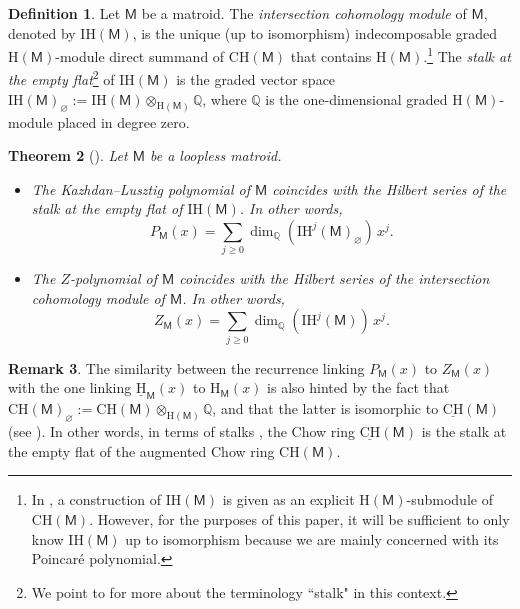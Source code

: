 \documentclass[11pt, a4paper, english]{amsart}
\theoremstyle{teoremas}
\newtheorem{theorem}{Theorem}[section]
\theoremstyle{definition}
\newtheorem{definition}[theorem]{Definition}
\newtheorem{remark}[theorem]{Remark}
\newcommand{\M}{\mathsf{M}}
\newcommand{\Q}{\mathbb{Q}}
\renewcommand{\H}{\mathrm{H}}
\newcommand{\CH}{\mathrm{CH}}
\newcommand{\IH}{\mathrm{IH}}
\newcommand{\uH}{\underline{\mathrm{H}}}
\newcommand{\uCH}{\underline{\mathrm{CH}}}
\begin{document}
\begin{definition}\label{def:ih}
    Let $\M$ be a matroid. The \textit{intersection cohomology module} of $\M$, denoted by $\IH(\M)$, is the unique (up to isomorphism) indecomposable graded $\H(\M)$-module direct summand of $\CH(\M)$ that contains $\H(\M)$.\footnote{In \cite[Definition 3.2]{braden-huh-matherne-proudfoot-wang}, a construction of $\IH(\M)$ is given as an explicit $\H(\M)$-submodule of $\CH(\M)$.  However, for the purposes of this paper, it will be sufficient to only know $\IH(\M)$ up to isomorphism because we are mainly concerned with its Poincar\'e polynomial.}  The \textit{stalk at the empty flat}\footnote{We point to \cite[Section~5]{braden-huh-matherne-proudfoot-wang} for more about the terminology ``stalk" in this context.} of $\IH(\M)$ is the graded vector space $\IH(\M)_\varnothing := \IH(\M) \otimes_{\H(\M)} \Q$, where $\Q$ is the one-dimensional graded $\H(\M)$-module placed in degree zero.
\end{definition}



\begin{theorem}[{\cite[Theorem~1.9]{braden-huh-matherne-proudfoot-wang}}]Let $\M$ be a loopless matroid.
\begin{itemize}
    \item The Kazhdan--Lusztig polynomial of $\M$ coincides with the Hilbert series of the stalk at the empty flat of $\IH(\M)$.  In other words,
        \[P_{\M}(x) = \sum_{j\ge0} \dim_{\Q}(\IH^j(\M)_\varnothing) \, x^j.\]
    
    \item The $Z$-polynomial of $\M$ coincides with the Hilbert series of the intersection cohomology module of $\M$. In other words,
    \[Z_{\M}(x) = \sum_{j\ge0} \dim_{\Q}(\IH^j(\M)) \, x^j.\]
\end{itemize}
\end{theorem}

\begin{remark}\label{remark:stalk-empty}
   The similarity between the recurrence linking $P_{\M}(x)$ to $Z_{\M}(x)$  with the one linking $\uH_{\M}(x)$ to $\H_{\M}(x)$ is also hinted by the fact that $\CH(\M)_{\varnothing} := \CH(\M)\otimes_{\H(\M)}\mathbb{Q}$, and that the latter is isomorphic to $\uCH(\M)$ (see \cite[Remark~1.4]{semismall}). In other words, in terms of stalks \cite[Section~5]{braden-huh-matherne-proudfoot-wang}, the Chow ring $\uCH(\M)$ is the stalk at the empty flat of the augmented Chow ring $\CH(\M)$.
\end{remark}
\end{document}
